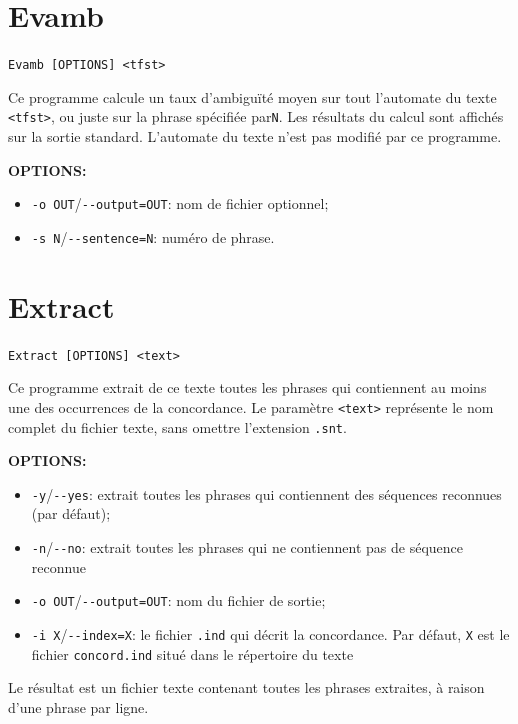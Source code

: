 \section{Evamb}
\verb+Evamb [OPTIONS] <tfst>+

\bigskip
\noindent Ce programme calcule un taux d’ambiguïté moyen sur tout l’automate du texte \verb+<tfst>+,
ou juste sur la phrase spécifiée par\verb+N+. Les résultats du calcul sont affichés sur la sortie standard. L’automate du texte n’est pas modifié par ce programme.

\bigskip
\noindent \textbf{OPTIONS:}
\begin{itemize}
\item \verb+-o OUT+/\verb+--output=OUT+: nom de fichier optionnel;
  \item \verb+-s N+/\verb+--sentence=N+: numéro de phrase.
\end{itemize}








\section{Extract}
\verb+Extract [OPTIONS] <text>+

\bigskip
\noindent Ce programme extrait de ce texte toutes les phrases qui contiennent au
moins une des occurrences de la concordance. Le paramètre
\verb+<text>+ représente le nom complet du fichier texte, sans omettre l'extension \verb+.snt+.

\bigskip
\noindent \textbf{OPTIONS:}
\begin{itemize}
\item \verb+-y+/\verb+--yes+: extrait toutes les phrases qui contiennent des séquences reconnues
	(par défaut);
\item \verb+-n+/\verb+--no+: extrait toutes les phrases qui ne contiennent pas de séquence reconnue
  \item \verb+-o OUT+/\verb+--output=OUT+: nom du fichier de sortie;
  \item \verb+-i X+/\verb+--index=X+: le fichier \verb+.ind+ qui décrit la concordance. Par défaut, \verb+X+ est le fichier \verb+concord.ind+ situé dans le répertoire du texte
\end{itemize}

\bigskip
\noindent Le résultat est un fichier texte contenant toutes les phrases extraites, à raison
d’une phrase par ligne.








